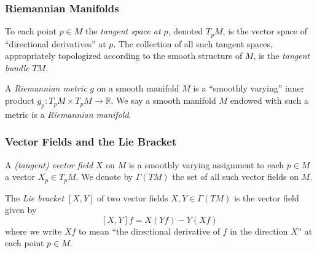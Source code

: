 \documentclass[handout]{beamer}
\newcommand{\R}{\mathbb{R}}
\theoremstyle{definition}
\begin{document}
\begin{frame}
    \frametitle{Riemannian Manifolds}

    \begin{definition}
        To each point $p \in M$ the \emph{tangent space at $p$}, denoted $T_pM$,
        is the vector space of ``directional derivatives'' at $p$. The collection
        of all such tangent spaces, appropriately topologized according to the
        smooth structure of $M$, is the \emph{tangent bundle} $TM$.
    \end{definition}
    \begin{definition}
        A \emph{Riemannian metric} $g$ on a smooth manifold $M$ is a ``smoothly varying''
        inner product $g_p : T_pM \times T_pM \to \R$.
        We say a smooth manifold $M$ endowed with such a metric is a \emph{Riemannian manifold}.
    \end{definition}
\end{frame}

\begin{frame}
    \frametitle{Vector Fields and the Lie Bracket}

    \begin{definition}
        A \emph{(tangent) vector field} $X$ on $M$ is a smoothly varying assignment
        to each $p \in M$ a vector $X_p \in T_pM$. We denote by $\Gamma(TM)$ the
        set of all such vector fields on $M$.
    \end{definition}

    \begin{definition}
        The \emph{Lie bracket} $[X,Y]$ of two vector fields $X, Y \in \Gamma(TM)$
        is the vector field given by
        \[
          [X,Y]f = X(Yf) - Y(Xf)  
        \]
        where we write $Xf$ to mean ``the directional derivative of $f$ in the direction $X$''
        at each point $p \in M$.
    \end{definition}

\end{frame}
\end{document}
